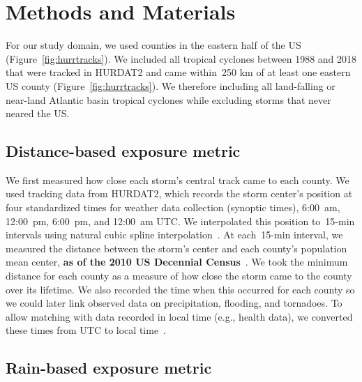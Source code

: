 \section*{Methods and Materials}

For our study domain, we used counties in the eastern half of the \ac{US}
(Figure~\ref{fig:hurrtracks}).  We included all tropical cyclones between 1988
and 2018 that were tracked in \ac{HURDAT2} \parencite{landsea2013} and came
within~250 \si{\kilo\metre} of at least one eastern \ac{US} county
(Figure~\ref{fig:hurrtracks}). We therefore including all land-falling or
near-land Atlantic basin tropical cyclones while excluding storms that never
neared the \ac{US}.  

\subsection*{Distance-based exposure metric}

We first measured how close each storm's central track came to each county. We
used tracking data from \ac{HURDAT2}, which records the storm center's position
at four standardized times for weather data collection (synoptic times),
6:00~am, 12:00~pm, 6:00~pm, and 12:00~am \ac{UTC}.  We interpolated this
position to~15-\si{\minute} intervals using natural cubic spline
interpolation~\parencite{hurricaneexposure}. At each~15-\si{\minute} interval,
we measured the distance between the storm's center and each county's
population mean center, \textbf{as of the 2010 US Decennial
Census}~\parencite{countycenters}. We took the minimum distance for each county
as a measure of how close the storm came to the county over its lifetime.  We
also recorded the time when this occurred for each county so we could later
link observed data on precipitation, flooding, and tornadoes.  To allow
matching with data recorded in local time (e.g., health data), we converted
these times from \ac{UTC} to local time~\parencite{countytimezones}.

\subsection*{Rain-based exposure metric}

